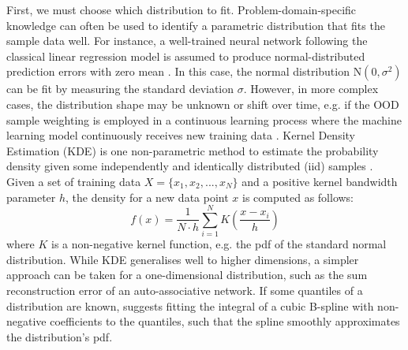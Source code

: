 \newpar First, we must choose which distribution to fit. Problem-domain-specific knowledge can often be used to identify a parametric distribution that fits the sample data well. For instance, a well-trained neural network following the classical linear regression model is assumed to produce normal-distributed prediction errors with zero mean \cite{clrm-assuptions-1971}. In this case, the normal distribution $\text{N}(0, \sigma^2)$ can be fit by measuring the standard deviation $\sigma$. However, in more complex cases, the distribution shape may be unknown or shift over time, e.g. if the OOD sample weighting is employed in a continuous learning process where the machine learning model continuously receives new training data \cite{lifelong-learning-2017}. Kernel Density Estimation (KDE) is one non-parametric method to estimate the probability density given some independently and identically distributed (iid) samples \cite{kde-1956, kde-1962}. Given a set of training data $X = \{x_1, x_2, ..., x_{N} \}$ and a positive kernel bandwidth parameter $h$, the density for a new data point $x$ is computed as follows:
\begin{equation} \label{eq:kernel-density}
    f(x) = \frac{1}{N \cdot h} \sum_{i = 1}^{N} K \left( \frac{x - x_i}{h} \right)
\end{equation}
where $K$ is a non-negative kernel function, e.g. the pdf of the standard normal distribution. While KDE generalises well to higher dimensions, a simpler approach can be taken for a one-dimensional distribution, such as the sum reconstruction error of an auto-associative network. If some quantiles of a distribution are known, \textcite{pdf-quantiles-2018} suggests fitting the integral of a cubic B-spline with non-negative coefficients to the quantiles, such that the spline smoothly approximates the distribution's pdf.

